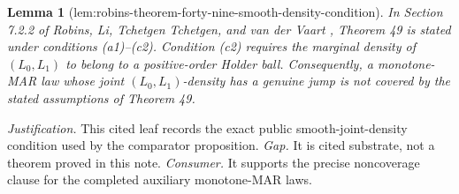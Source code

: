 \documentclass{article}
\newtheorem{lemma}{Lemma}
\begin{document}
\begin{lemma}[lem:robins-theorem-forty-nine-smooth-density-condition]\label{lem:robins-theorem-forty-nine-smooth-density-condition}
In Section 7.2.2 of Robins, Li, Tchetgen Tchetgen, and van der Vaart \cite{RobinsLiTchetgenVanderVaart2016TR}, Theorem 49 is stated under conditions (a1)--(c2). Condition (c2) requires the marginal density of \((L_0,L_1)\) to belong to a positive-order Holder ball. Consequently, a monotone-MAR law whose joint \((L_0,L_1)\)-density has a genuine jump is not covered by the stated assumptions of Theorem 49.
\end{lemma}
\par\smallskip\noindent \textit{Justification.} This cited leaf records the exact public smooth-joint-density condition used by the comparator proposition. \textit{Gap.} It is cited substrate, not a theorem proved in this note. \textit{Consumer.} It supports the precise noncoverage clause for the completed auxiliary monotone-MAR laws.
\end{document}

